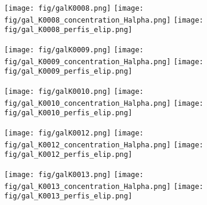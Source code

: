 \begin{figure}[!ht]
\begin{center}
\setcaptionmargin{1cm}
\texttt{[image: fig/galK0008.png]}
\texttt{[image: fig/gal\_K0008\_concentration\_Halpha.png]}
\texttt{[image: fig/gal\_K0008\_perfis\_elip.png]}
\end{center}
\end{figure}


\begin{figure}[!ht]
\begin{center}
\setcaptionmargin{1cm}
\texttt{[image: fig/galK0009.png]}
\texttt{[image: fig/gal\_K0009\_concentration\_Halpha.png]}
\texttt{[image: fig/gal\_K0009\_perfis\_elip.png]}
\end{center}
\end{figure}


\begin{figure}[!ht]
\begin{center}
\setcaptionmargin{1cm}
\texttt{[image: fig/galK0010.png]}
\texttt{[image: fig/gal\_K0010\_concentration\_Halpha.png]}
\texttt{[image: fig/gal\_K0010\_perfis\_elip.png]}
\end{center}
\end{figure}


\begin{figure}[!ht]
\begin{center}
\setcaptionmargin{1cm}
\texttt{[image: fig/galK0012.png]}
\texttt{[image: fig/gal\_K0012\_concentration\_Halpha.png]}
\texttt{[image: fig/gal\_K0012\_perfis\_elip.png]}
\end{center}
\end{figure}


\begin{figure}[!ht]
\begin{center}
\setcaptionmargin{1cm}
\texttt{[image: fig/galK0013.png]}
\texttt{[image: fig/gal\_K0013\_concentration\_Halpha.png]}
\texttt{[image: fig/gal\_K0013\_perfis\_elip.png]}
\end{center}
\end{figure}


